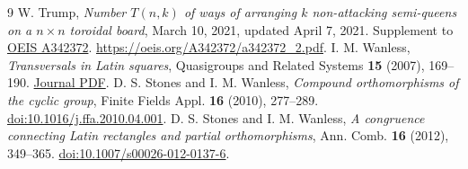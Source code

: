 \documentclass[11pt]{article}
\begin{document}
\small
\begin{thebibliography}{9}
 W. Trump, \emph{Number $T(n,k)$ of ways of arranging $k$ non-attacking semi-queens on a $n\times n$ toroidal board}, March 10, 2021, updated April 7, 2021. Supplement to \href{https://oeis.org/A342372}{OEIS A342372}. \url{https://oeis.org/A342372/a342372_2.pdf}.
 I. M. Wanless, \emph{Transversals in Latin squares}, Quasigroups and Related Systems \textbf{15} (2007), 169--190. \href{https://mfoi2017.math.md/files/qrs/v15-n1/v15-n1-\%28pp169-190\%29.pdf}{Journal PDF}.
 D. S. Stones and I. M. Wanless, \emph{Compound orthomorphisms of the cyclic group}, Finite Fields Appl. \textbf{16} (2010), 277--289. \href{https://doi.org/10.1016/j.ffa.2010.04.001}{doi:10.1016/j.ffa.2010.04.001}.
 D. S. Stones and I. M. Wanless, \emph{A congruence connecting Latin rectangles and partial orthomorphisms}, Ann. Comb. \textbf{16} (2012), 349--365. \href{https://doi.org/10.1007/s00026-012-0137-6}{doi:10.1007/s00026-012-0137-6}.
\end{thebibliography}
\end{document}
